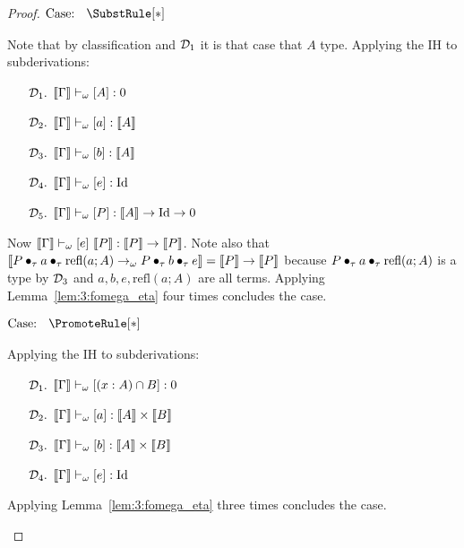 \begin{proof}
    $\text{Case: }\begin{array}{c} \SubstRule[*] \end{array}$
    \begin{proofcase}
        Note that by classification and $\mathcal{D}_{1}$ it is that case that $A$ type.
        Applying the IH to subderivations:
        \begin{enumerate}
            \item[$\mathcal{D}_{1}.$] $\llbracket \Gamma \rrbracket \vdash_\omega [A] : 0$
            \item[$\mathcal{D}_{2}.$] $\llbracket \Gamma \rrbracket \vdash_\omega [a] : \llbracket A \rrbracket$
            \item[$\mathcal{D}_{3}.$] $\llbracket \Gamma \rrbracket \vdash_\omega [b] : \llbracket A \rrbracket$ 
            \item[$\mathcal{D}_{4}.$] $\llbracket \Gamma \rrbracket \vdash_\omega [e] : \textnormal{Id}$
            \item[$\mathcal{D}_{5}.$] $\llbracket \Gamma \rrbracket \vdash_\omega [P] : \llbracket A \rrbracket \to \textnormal{Id} \to 0$
        \end{enumerate}
        Now $\sema{\Gamma} \vdash_\omega [e]\ \sema{P} : \sema{P} \to \sema{P}$.
        Note also that $\llbracket P \bullet_{\tau} a \bullet_{\tau} \text{refl}(a;A) \to_\omega P \bullet_{\tau} b \bullet_{\tau} e \rrbracket = \llbracket P \rrbracket \to \llbracket P \rrbracket$ because $P \bullet_{\tau} a \bullet_{\tau} \text{refl}(a;A)$ is a type by $\mathcal{D}_{3}$ and $a, b, e, \text{refl}(a;A)$ are all terms.
        Applying Lemma~\ref{lem:3:fomega_eta} four times concludes the case.
    \end{proofcase}

    $\text{Case: }\begin{array}{c} \PromoteRule[*] \end{array}$
    \begin{proofcase}
        Applying the IH to subderivations:
        \begin{enumerate}
            \item[$\mathcal{D}_{1}.$] $\llbracket \Gamma \rrbracket \vdash_\omega [(x : A) \cap B] : 0$
            \item[$\mathcal{D}_{2}.$] $\llbracket \Gamma \rrbracket \vdash_\omega [a] : \llbracket A \rrbracket \times \llbracket B \rrbracket$
            \item[$\mathcal{D}_{3}.$] $\llbracket \Gamma \rrbracket \vdash_\omega [b] : \llbracket A \rrbracket \times \llbracket B \rrbracket$
            \item[$\mathcal{D}_{4}.$] $\llbracket \Gamma \rrbracket \vdash_\omega [e] : \textnormal{Id}$
        \end{enumerate}
        Applying Lemma~\ref{lem:3:fomega_eta} three times concludes the case.
    \end{proofcase}


\end{proof}
